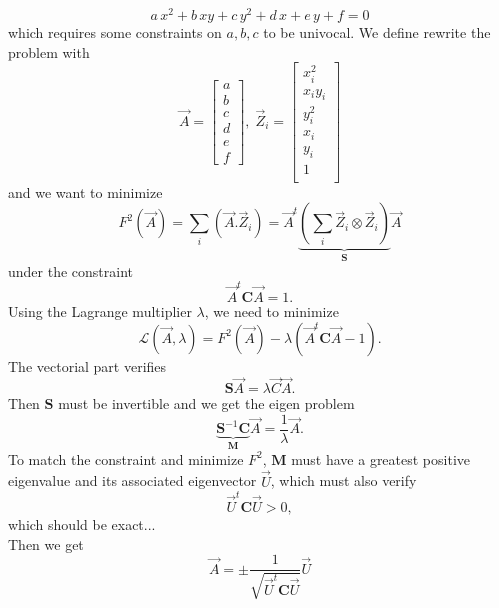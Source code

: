 \documentclass[aps]{revtex4}
\begin{document}
\begin{equation}
\label{eq:ell_alg}
	a\,x^2+b\,xy+c\,y^2 + d\,x+e\,y+f = 0
\end{equation}
which requires some constraints on $a,b,c$ to be univocal.
We define rewrite the problem with
\begin{equation}
	\vec{A} = \begin{bmatrix}
	a\\
	b\\
	c\\
	d\\
	e\\
	f
	\end{bmatrix}, 
	\; 
	\vec{Z}_i = 
	\begin{bmatrix}
	x_i^2\\
	x_iy_i\\
	y_i^2\\
	x_i\\
	y_i\\
	1\\
	\end{bmatrix}
\end{equation}
and we want to minimize
\begin{equation}
F^2\left(\vec{A}\right) = \sum_i \left(\vec{A}.\vec{Z}_i\right) 
= \vec{A}^t \underbrace{\left(\sum_i \vec{Z}_i \otimes \vec{Z}_i \right)}_{\bm{S}} \vec{A}
\end{equation}
under the constraint
\begin{equation}
	\vec{A}^t \bm{C} \vec{A} = 1.
\end{equation}
Using the Lagrange multiplier $\lambda$, we need to minimize
\begin{equation}
	\mathcal{L}\left(\vec{A},\lambda\right) = F^2\left(\vec{A}\right) - \lambda \left( \vec{A}^t \bm{C} \vec{A} -1 \right).
\end{equation}
The vectorial part verifies
\begin{equation}
	\bm{S} \vec{A} = \lambda \vec{C} \vec{A}.
\end{equation}
Then $\bm{S}$ must be invertible and we get the eigen problem
\begin{equation}
	\underbrace{\bm{S}^{-1}\bm{C}}_{\displaystyle \bm{M}} \vec{A} = \dfrac{1}{\lambda} \vec{A}.
\end{equation}
To match the constraint and minimize $F^2$, $\bm{M}$ must have a greatest positive eigenvalue
and its associated eigenvector $\vec{U}$, which must also verify 
\begin{equation}
	\vec{U}^t \bm{C} \vec{U} > 0,
\end{equation}
which should be exact...\\
Then we get
\begin{equation}
	\vec{A} = \pm\dfrac{1}{\sqrt{\vec{U}^t \bm{C} \vec{U}}} \vec{U}
\end{equation}
\end{document}
